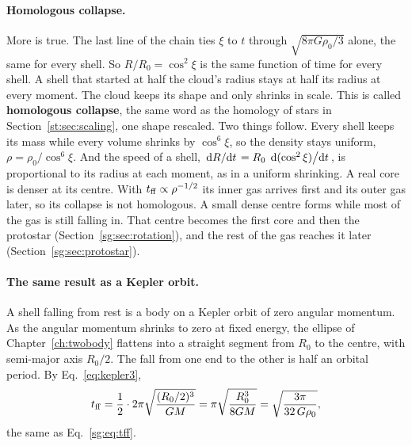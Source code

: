 \paragraph{Homologous collapse.} More is true. The last line of the chain ties $\xi$ to $t$ through $\sqrt{8\pi G\rho_0/3}$ alone, the same for every shell. So $R/R_0=\cos^2\xi$ is the same function of time for every shell. A shell that started at half the cloud's radius stays at half its radius at every moment. The cloud keeps its shape and only shrinks in scale. This is called \textbf{homologous collapse}, the same word as the homology of stars in Section~\ref{st:sec:scaling}, one shape rescaled. Two things follow. Every shell keeps its mass while every volume shrinks by $\cos^6\xi$, so the density stays uniform, $\rho=\rho_0/\cos^6\xi$. And the speed of a shell, $\dv*{R}{t}=R_0\,\dv*{(\cos^2\xi)}{t}$, is proportional to its radius at each moment, as in a uniform shrinking. A real core is denser at its centre. With $t_{\rm ff}\propto\rho^{-1/2}$ its inner gas arrives first and its outer gas later, so its collapse is not homologous. A small dense centre forms while most of the gas is still falling in. That centre becomes the first core and then the protostar (Section~\ref{sg:sec:rotation}), and the rest of the gas reaches it later (Section~\ref{sg:sec:protostar}).

\paragraph{The same result as a Kepler orbit.} A shell falling from rest is a body on a Kepler orbit of zero angular momentum. As the angular momentum shrinks to zero at fixed energy, the ellipse of Chapter~\ref{ch:twobody} flattens into a straight segment from $R_0$ to the centre, with semi-major axis $R_0/2$. The fall from one end to the other is half an orbital period. By Eq.~\eqref{eq:kepler3},
\[
t_{\rm ff}=\frac12\cdot2\pi\sqrt{\frac{(R_0/2)^3}{GM}}=\pi\sqrt{\frac{R_0^3}{8GM}}=\sqrt{\frac{3\pi}{32\,G\rho_0}},
\]
the same as Eq.~\eqref{sg:eq:tff}.

